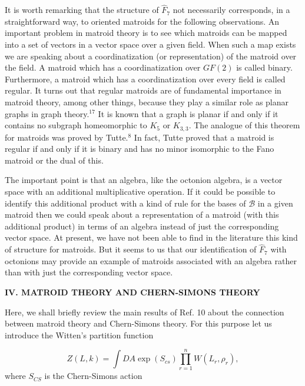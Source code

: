 \documentclass[a4paper,12pt]{article}
\begin{document}
It is worth remarking that the structure of $\hat{F}_{7}$ not necessarily
corresponds, in a straightforward way, to oriented matroids for the
following observations. An important problem in matroid theory is to see
which matroids can be mapped into a set of vectors in a vector space over a
given field. When such a map exists we are speaking about a coordinatization
(or representation) of the matroid over the field. A matroid which has a
coordinatization over $GF(2)$ is called binary. Furthermore, a matroid which
has a coordinatization over every field is called regular. It turns out that
regular matroids are of fundamental importance in matroid theory, among
other things, because they play a similar role as planar graphs in graph
theory.$^{17}$ It is known that a graph is planar if and only if it contains
no subgraph homeomorphic to $K_{5}$ or $K_{3,3}$. The analogue of this
theorem for matroids was proved by Tutte.$^{8}$ In fact, Tutte proved that a
matroid is regular if and only if it is binary and has no minor isomorphic
to the Fano matroid or the dual of this.

The important point is that an algebra, like the octonion algebra, is a
vector space with an additional multiplicative operation. If it could be
possible to identify this additional product with a kind of rule for the
bases of $\mathcal{B}$ in a given matroid then we could speak about a
representation of a matroid (with this additional product) in terms of an
algebra instead of just the corresponding vector space. At present, we have
not been able to find in the literature this kind of structure for matroids.
But it seems to us that our identification of $\hat{F}_{7}$ with octonions
may provide an example of matroids associated with an algebra rather than
with just the corresponding vector space.

\bigskip

\smallskip

\noindent \textbf{IV. MATROID THEORY AND CHERN-SIMONS THEORY}

\bigskip

Here, we shall briefly review the main results of Ref. 10 about the
connection between matroid theory and Chern-Simons theory. For this purpose
let us introduce the Witten's partition function

\begin{equation}
Z(L,k)=\int DA\exp (S_{cs})\prod\limits_{r=1}^{n}W(L_{r},\rho _{r}),
\label{6}
\end{equation}
where $S_{CS}$ is the Chern-Simons action
\end{document}
